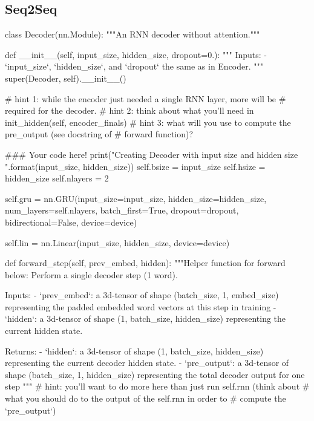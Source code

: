 \subsection*{Seq2Seq}
\begin{python}
    class Decoder(nn.Module):
  """An RNN decoder without attention."""

  def __init__(self, input_size, hidden_size, dropout=0.):
    """
      Inputs:
        - `input_size`, `hidden_size`, and `dropout` the same as in Encoder.
    """
    super(Decoder, self).__init__()

    # hint 1: while the encoder just needed a single RNN layer, more will be
    #         required for the decoder.
    # hint 2: think about what you'll need in init_hidden(self, encoder_finals)
    # hint 3: what will you use to compute the pre_output (see docstring of
    #         forward function)?

    ### Your code here!
    print("Creating Decoder with input size {} and hidden size {}".format(input_size, hidden_size))
    self.bsize = input_size
    self.hsize = hidden_size
    self.nlayers = 2
    
    self.gru = nn.GRU(input_size=input_size, 
                      hidden_size=hidden_size, 
                      num_layers=self.nlayers, 
                      batch_first=True, dropout=dropout, 
                      bidirectional=False, device=device)
    
    self.lin = nn.Linear(input_size, hidden_size, device=device)

  def forward_step(self, prev_embed, hidden):
    """Helper function for forward below:
       Perform a single decoder step (1 word).

       Inputs:
      - `prev_embed`: a 3d-tensor of shape (batch_size, 1, embed_size)
          representing the padded embedded word vectors at this step in training
      - `hidden`: a 3d-tensor of shape (1, batch_size, hidden_size) representing
          the current hidden state.

      Returns:
      - `hidden`: a 3d-tensor of shape (1, batch_size, hidden_size)
          representing the current decoder hidden state.
      - `pre_output`: a 3d-tensor of shape (batch_size, 1, hidden_size)
          representing the total decoder output for one step
    """
    # hint: you'll want to do more here than just run self.rnn (think about
    #       what you should do to the output of the self.rnn in order to
    #       compute the `pre_output`)


\end{python}
